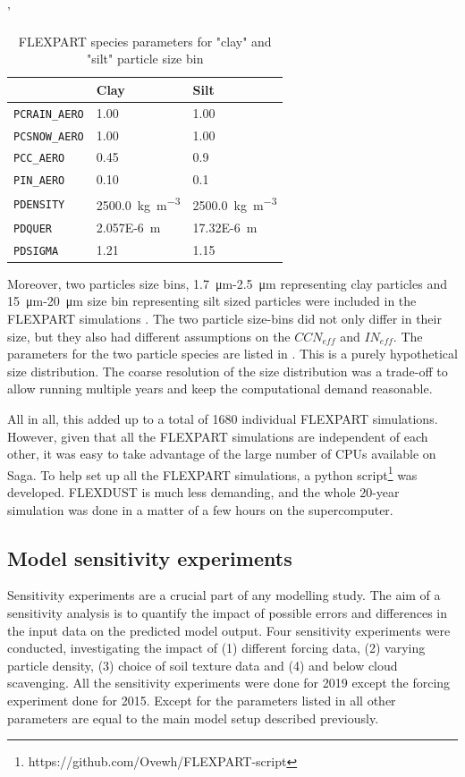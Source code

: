 \begin{table}[htpb]
\caption{FLEXPART species parameters for "clay" and "silt" particle size bin}
\label{tab:particle_params}'
\centering
\begin{tabular}{@{}lll@{}}
\toprule
 & Clay  & Silt \\ \midrule
\verb|PCRAIN_AERO| & 1.00  & 1.00 \\
\verb|PCSNOW_AERO| & 1.00  &  1.00 \\
\verb|PCC_AERO| & 0.45 \parencite{flexdust_ref_2016}   &  0.9\parencite{flexdust_ref_2016} \\
\verb|PIN_AERO| & 0.10 \parencite{flexdust_ref_2016} & 0.1 \parencite{flexdust_ref_2016} \\
\verb|PDENSITY| & \SI{2500.0}{\kg\per\cubic\metre}    & \SI{2500.0}{\kg\per\cubic\metre} \\
\verb|PDQUER| & \SI{2.057E-6}{\metre}    &  \SI{17.32E-6}{\metre}   \\
\verb|PDSIGMA| & 1.21   &  1.15    \\ \bottomrule
\end{tabular}%
\end{table}

Moreover, two particles size bins, \SI{1.7}{\micro\metre}-\SI{2.5}{\micro\metre} representing clay particles and  \SI{15}{\micro\metre}-\SI{20}{\micro\metre} size bin representing silt sized particles were included in the FLEXPART simulations . 
The two particle size-bins did not only differ in their size, but they also had different assumptions on the $CCN_{eff}$ and $IN_{eff}$. 
The parameters for the two particle species are listed in . 
This is a purely hypothetical size distribution. The coarse resolution of the size distribution was a trade-off to allow running multiple years and keep the computational demand reasonable.  

All in all, this added up to a total of 1680 individual FLEXPART simulations.
However, given that all the FLEXPART simulations are independent of each other, it was easy to take advantage of the large number of CPUs available on Saga.  
To help set up all the FLEXPART simulations, a python script\footnote{https://github.com/Ovewh/FLEXPART-script} was developed. 
FLEXDUST is much less demanding, and the whole 20-year simulation was done in a matter of a few hours on the supercomputer. 

\subsection{Model sensitivity experiments}
Sensitivity experiments are a crucial part of any modelling study. The aim of a sensitivity analysis is to quantify the impact of possible errors and differences in the input data on the predicted model output. Four sensitivity experiments were conducted, investigating the impact of (1) different forcing data, (2) varying particle density, (3) choice of soil texture data and (4) and below cloud scavenging. All the sensitivity experiments were done for 2019 except the forcing experiment done for 2015. Except for the parameters listed in  all other parameters are equal to the main model setup described previously. 

